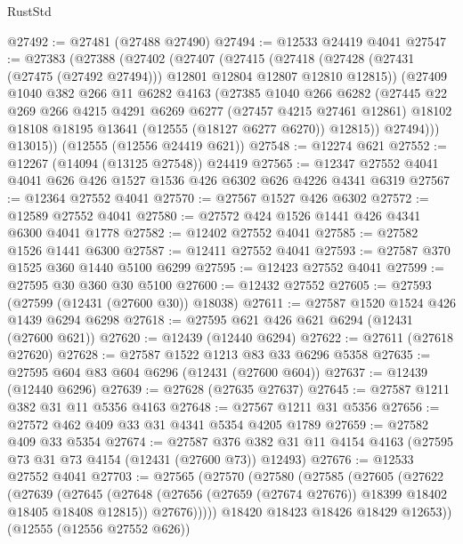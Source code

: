 \begin{lexlean}{RustStd}
\begin{coremodule}
@27492 := @27481 (@27488 @27490)
@27494 := @12533 @24419 @4041
@27547 := @27383
    (@27388
      (@27402
        (@27407
          (@27415
            (@27418 (@27428 (@27431 (@27475 (@27492 @27494))) @12801 @12804 @12807 @12810 @12815))
            (@27409
              @1040
              @382
              @266
              @11
              @6282
              @4163
              (@27385
                @1040
                @266
                @6282
                (@27445
                  @22
                  @269
                  @266
                  @4215
                  @4291
                  @6269
                  @6277
                  (@27457 @4215 @27461 @12861)
                  @18102
                  @18108
                  @18195
                  @13641
                  (@12555 (@18127 @6277 @6270))
                  @12815))
              @27494)))
        @13015))
    (@12555 (@12556 @24419 @621))
@27548 := @12274 @621
@27552 := @12267 (@14094 (@13125 @27548)) @24419
@27565 := @12347 @27552 @4041 @4041 @626 @426 @1527 @1536 @426 @6302 @626 @4226 @4341 @6319
@27567 := @12364 @27552 @4041
@27570 := @27567 @1527 @426 @6302
@27572 := @12589 @27552 @4041
@27580 := @27572 @424 @1526 @1441 @426 @4341 @6300 @4041 @1778
@27582 := @12402 @27552 @4041
@27585 := @27582 @1526 @1441 @6300
@27587 := @12411 @27552 @4041
@27593 := @27587 @370 @1525 @360 @1440 @5100 @6299
@27595 := @12423 @27552 @4041
@27599 := @27595 @30 @360 @30 @5100
@27600 := @12432 @27552
@27605 := @27593 (@27599 (@12431 (@27600 @30)) @18038)
@27611 := @27587 @1520 @1524 @426 @1439 @6294 @6298
@27618 := @27595 @621 @426 @621 @6294 (@12431 (@27600 @621))
@27620 := @12439 (@12440 @6294)
@27622 := @27611 (@27618 @27620)
@27628 := @27587 @1522 @1213 @83 @33 @6296 @5358
@27635 := @27595 @604 @83 @604 @6296 (@12431 (@27600 @604))
@27637 := @12439 (@12440 @6296)
@27639 := @27628 (@27635 @27637)
@27645 := @27587 @1211 @382 @31 @11 @5356 @4163
@27648 := @27567 @1211 @31 @5356
@27656 := @27572 @462 @409 @33 @31 @4341 @5354 @4205 @1789
@27659 := @27582 @409 @33 @5354
@27674 := @27587
    @376
    @382
    @31
    @11
    @4154
    @4163
    (@27595 @73 @31 @73 @4154 (@12431 (@27600 @73)) @12493)
@27676 := @12533 @27552 @4041
@27703 := @27565
    (@27570
      (@27580
        (@27585
          (@27605
            (@27622
              (@27639
                (@27645
                  (@27648 (@27656 (@27659 (@27674 @27676)) @18399 @18402 @18405 @18408 @12815))
                  @27676)))))
        @18420
        @18423
        @18426
        @18429
        @12653))
    (@12555 (@12556 @27552 @626))

\end{coremodule}
\end{lexlean}

